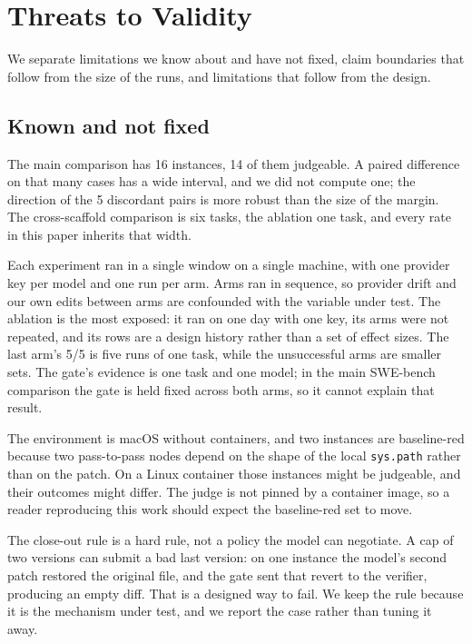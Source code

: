 \section{Threats to Validity}
\label{sec:threats}

We separate limitations we know about and have not fixed, claim boundaries that follow from the size of the runs, and limitations that follow from the design.

\subsection{Known and not fixed}

The main comparison has 16 instances, 14 of them judgeable. A paired difference on that many cases has a wide interval, and we did not compute one; the direction of the 5 discordant pairs is more robust than the size of the margin. The cross-scaffold comparison is six tasks, the ablation one task, and every rate in this paper inherits that width.

Each experiment ran in a single window on a single machine, with one provider key per model and one run per arm. Arms ran in sequence, so provider drift and our own edits between arms are confounded with the variable under test. The ablation is the most exposed: it ran on one day with one key, its arms were not repeated, and its rows are a design history rather than a set of effect sizes. The last arm's 5/5 is five runs of one task, while the unsuccessful arms are smaller sets. The gate's evidence is one task and one model; in the main SWE-bench comparison the gate is held fixed across both arms, so it cannot explain that result.

The environment is macOS without containers, and two instances are baseline-red because two pass-to-pass nodes depend on the shape of the local \texttt{sys.path} rather than on the patch. On a Linux container those instances might be judgeable, and their outcomes might differ. The judge is not pinned by a container image, so a reader reproducing this work should expect the baseline-red set to move.

The close-out rule is a hard rule, not a policy the model can negotiate. A cap of two versions can submit a bad last version: on one instance the model's second patch restored the original file, and the gate sent that revert to the verifier, producing an empty diff. That is a designed way to fail. We keep the rule because it is the mechanism under test, and we report the case rather than tuning it away.

